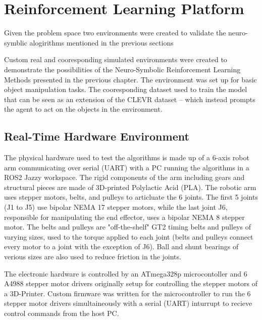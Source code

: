 \documentclass[doublespace,draft,nopageskip]{VTthesis} %
\begin{document}
    \chapter{Reinforcement Learning Platform}
   Given the problem space two environments were created to validate the neuro-symblic alogirithms mentioned in the previous sections

    Custom real and cooresponding simulated environments were created to demonstrate the possibilities of the Neuro-Symbolic Reinforcement Learning Methods presented in the previous chapter. The environment was set up for basic object manipulation tasks. The cooresponding dataset used to train the model that can be seen as an extension of the CLEVR dataset -- which instead prompts the agent to act on the objects in the environment.
    \section{Real-Time Hardware Environment}  \label{se:real_hardware_environment}
    The physical hardware used to test the algorithms is made up of a 6-axis robot arm communicating over serial (UART) with a PC running the algorithms in a ROS2 Jazzy workspace.
    The rigid components of the arm including gears and structural pieces are made of 3D-printed Polylactic Acid (PLA).
    The robotic arm uses stepper motors, belts, and pulleys to articluate the 6 joints. 
    The first 5 joints (J1 to J5) use bipolar NEMA 17 stepper motors, while the last joint J6, responsible for manipulating the end effector, uses a bipolar NEMA 8 stepper motor.
    The belts and pulleys are "off-the-shelf" GT2 timing belts and pulleys of varying sizes, used to the torque applied to each joint (belts and pulleys connect every motor to a joint with the exception of J6).
    Ball and shunt bearings of verious sizes are also used to reduce friction in the joints.

    The electronic hardware is controlled by an ATmega328p microcontoller and 6 A4988 stepper motor drivers originally setup for controlling the stepper motors of a 3D-Printer.
   Custom firmware was written for the microcontroller to run the 6 stepper motor drivers simultaineously with a serial (UART) inturrupt to recieve control commands from the host PC. 
\end{document}
